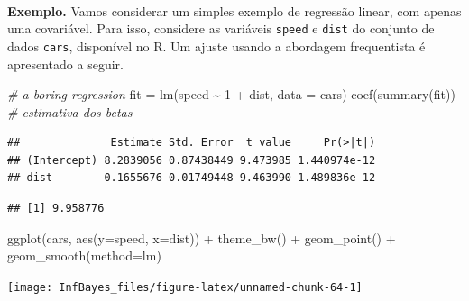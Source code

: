 \documentclass[
]{book}
\newenvironment{Shaded}{\begin{snugshade}}{\end{snugshade}}
\newcommand{\AttributeTok}[1]{\textcolor[rgb]{0.77,0.63,0.00}{#1}}
\newcommand{\CommentTok}[1]{\textcolor[rgb]{0.56,0.35,0.01}{\textit{#1}}}
\newcommand{\DecValTok}[1]{\textcolor[rgb]{0.00,0.00,0.81}{#1}}
\newcommand{\FunctionTok}[1]{\textcolor[rgb]{0.00,0.00,0.00}{#1}}
\newcommand{\NormalTok}[1]{#1}
\newcommand{\OtherTok}[1]{\textcolor[rgb]{0.56,0.35,0.01}{#1}}
\newcommand{\SpecialCharTok}[1]{\textcolor[rgb]{0.00,0.00,0.00}{#1}}
\begin{document}
\(~\)

\textbf{Exemplo.} Vamos considerar um simples exemplo de regressão linear, com apenas uma covariável. Para isso, considere as variáveis \texttt{speed} e \texttt{dist} do conjunto de dados \texttt{cars}, disponível no R. Um ajuste usando a abordagem frequentista é apresentado a seguir.

\begin{Shaded}
\begin{Highlighting}[]
\CommentTok{\# a boring regression}
\NormalTok{fit }\OtherTok{=} \FunctionTok{lm}\NormalTok{(speed }\SpecialCharTok{\textasciitilde{}} \DecValTok{1} \SpecialCharTok{+}\NormalTok{ dist, }\AttributeTok{data =}\NormalTok{ cars)}
\FunctionTok{coef}\NormalTok{(}\FunctionTok{summary}\NormalTok{(fit)) }\CommentTok{\# estimativa dos betas}
\end{Highlighting}
\end{Shaded}

\begin{verbatim}
##              Estimate Std. Error  t value     Pr(>|t|)
## (Intercept) 8.2839056 0.87438449 9.473985 1.440974e-12
## dist        0.1655676 0.01749448 9.463990 1.489836e-12
\end{verbatim}

\begin{Shaded}
\end{Shaded}

\begin{verbatim}
## [1] 9.958776
\end{verbatim}

\begin{Shaded}
\begin{Highlighting}[]
\FunctionTok{ggplot}\NormalTok{(cars, }\FunctionTok{aes}\NormalTok{(}\AttributeTok{y=}\NormalTok{speed, }\AttributeTok{x=}\NormalTok{dist)) }\SpecialCharTok{+} \FunctionTok{theme\_bw}\NormalTok{() }\SpecialCharTok{+}
  \FunctionTok{geom\_point}\NormalTok{() }\SpecialCharTok{+} \FunctionTok{geom\_smooth}\NormalTok{(}\AttributeTok{method=}\NormalTok{lm)}
\end{Highlighting}
\end{Shaded}

\begin{center}\texttt{[image: InfBayes\_files/figure-latex/unnamed-chunk-64-1]} \end{center}
\end{document}

